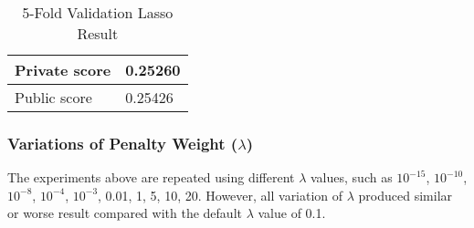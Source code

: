 \begin{table}[h]
	\centering
	\caption{5-Fold Validation Lasso Result}
	\label{tab:lasso_result_5_fold}
	\begin{tabular}{|m{100pt}|m{50pt}|}
		\hline
		Private score & 0.25260 \\ \hline
		Public score  & 0.25426 \\ \hline
	\end{tabular}
\end{table}

\subsubsection{Variations of Penalty Weight ($\lambda$)}
The experiments above are repeated using different $\lambda$ values, such as $10^{-15}$, $10^{-10}$, $10^{-8}$, $10^{-4}$, $10^{-3}$, 0.01, 1, 5, 10, 20.
However, all variation of $\lambda$ produced similar or worse result compared with the default $\lambda$ value of 0.1.